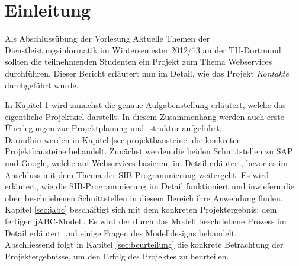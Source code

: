 \section{Einleitung}
\label{sec:einleitung}
Als Abschlussübung der Vorlesung Aktuelle Themen der Dienstleistungsinformatik im Wintersemester
 2012/13 an der TU-Dortmund sollten die teilnehmenden Studenten ein Projekt zum Thema Webservices
 durchführen. Dieser Bericht erläutert nun im Detail, wie das Projekt \textit{Kontakte} durchgeführt wurde.

In Kapitel \ref{sec:einleitung} wird zunächst die genaue Aufgabenstellung erläutert, welche das eigentliche Projektziel darstellt. In diesem Zusammenhang werden auch erste Überlegungen zur Projektplanung und -struktur aufgeführt.\\

Daraufhin werden in Kapitel \ref{sec:projektbausteine} die konkreten Projektbausteine behandelt. Zunächst werden die beiden Schnittstellen zu SAP und Google, welche auf Webservices basieren, im Detail erläutert, bevor es im Anschluss mit dem Thema der SIB-Programmierung weitergeht. Es wird erläutert, wie die SIB-Programmierung im Detail funktioniert und inwiefern die oben beschriebenen Schnittstellen in diesem Bereich ihre Anwendung finden.\\

Kapitel \ref{sec:jabc} beschäftigt sich mit dem konkreten Projektergebnis: dem fertigen jABC-Modell. Es wird der durch das Modell beschriebene Prozess im Detail erläutert und einige Fragen des Modelldesigns behandelt.\\

Abschliessend folgt in Kapitel \ref{sec:beurteilung} die konkrete Betrachtung der Projektergebnisse, um den Erfolg des Projektes zu beurteilen. 


